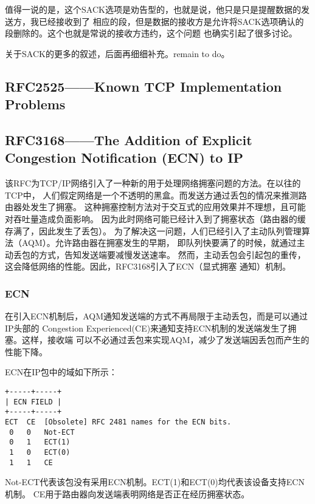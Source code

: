 			值得一说的是，这个SACK选项是劝告型的，也就是说，他只是只是提醒数据的发送方，我已经接收到了
			相应的段，但是数据的接收方是允许将SACK选项确认的段删除的。这个也就是常说的接收方违约，这个问题
			也确实引起了很多讨论。

			关于SACK的更多的叙述，后面再细细补充。remain to do。
    \subsection{RFC2525——Known TCP Implementation Problems}
    \label{subsec:rfc2525}
        
\subsection{RFC3168——The Addition of Explicit Congestion Notification (ECN) to IP}
\label{subsec:rfc3168}
该RFC为TCP/IP网络引入了一种新的用于处理网络拥塞问题的方法。在以往的TCP中，
人们假定网络是一个不透明的黑盒。而发送方通过丢包的情况来推测路由器处发生了拥塞。
这种拥塞控制方法对于交互式的应用效果并不理想，且可能对吞吐量造成负面影响。
因为此时网络可能已经计入到了拥塞状态（路由器的缓存满了，因此发生了丢包）。
为了解决这一问题，人们已经引入了主动队列管理算法（AQM）。允许路由器在拥塞发生的早期，
即队列快要满了的时候，就通过主动丢包的方式，告知发送端要减慢发送速率。
然而，主动丢包会引起包的重传，这会降低网络的性能。因此，RFC3168引入了ECN（显式拥塞
通知）机制。

\subsubsection{ECN}
\label{subsubsec:ecn}
在引入ECN机制后，AQM通知发送端的方式不再局限于主动丢包，而是可以通过IP头部的
Congestion Experienced(CE)来通知支持ECN机制的发送端发生了拥塞。这样，接收端
可以不必通过丢包来实现AQM，减少了发送端因丢包而产生的性能下降。

ECN在IP包中的域如下所示：
\begin{verbatim}
+-----+-----+ 
| ECN FIELD | 
+-----+-----+ 
ECT  CE  [Obsolete] RFC 2481 names for the ECN bits. 
 0   0   Not-ECT 
 0   1   ECT(1) 
 1   0   ECT(0) 
 1   1   CE
\end{verbatim}

Not-ECT代表该包没有采用ECN机制。ECT(1)和ECT(0)均代表该设备支持ECN机制。
CE用于路由器向发送端表明网络是否正在经历拥塞状态。

